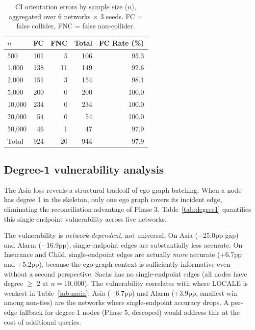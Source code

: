 \documentclass{article}
\begin{document}
\begin{table}[t]
\centering
\caption{CI orientation errors by sample size ($n$), aggregated over 6 networks $\times$ 3 seeds. FC = false collider, FNC = false non-collider.}
\label{tab:nco}
\small
\begin{tabular}{lrrrr}
\toprule
$n$ & FC & FNC & Total & FC Rate (\%) \\
\midrule
500    & 101 & 5  & 106 & 95.3 \\
1{,}000  & 138 & 11 & 149 & 92.6 \\
2{,}000  & 151 & 3  & 154 & 98.1 \\
5{,}000  & 200 & 0  & 200 & 100.0 \\
10{,}000 & 234 & 0  & 234 & 100.0 \\
20{,}000 & 54  & 0  & 54  & 100.0 \\
50{,}000 & 46  & 1  & 47  & 97.9 \\
\midrule
Total  & 924 & 20 & 944 & 97.9 \\
\bottomrule
\end{tabular}
\end{table}

\subsection{Degree-1 vulnerability analysis}
\label{sec:degree1}

The Asia loss reveals a structural tradeoff of ego-graph batching. When a node has degree 1 in the skeleton, only one ego graph covers its incident edge, eliminating the reconciliation advantage of Phase 3. Table~\ref{tab:degree1} quantifies this single-endpoint vulnerability across five networks.

The vulnerability is \textit{network-dependent}, not universal. On Asia ($-$25.0pp gap) and Alarm ($-$16.9pp), single-endpoint edges are substantially less accurate. On Insurance and Child, single-endpoint edges are actually \textit{more} accurate (+6.7pp and +5.2pp), because the ego-graph context is sufficiently informative even without a second perspective. Sachs has no single-endpoint edges (all nodes have degree $\geq$ 2 at $n{=}10{,}000$). The vulnerability correlates with where LOCALE is weakest in Table~\ref{tab:main}: Asia ($-6.7$pp) and Alarm (+3.9pp, smallest win among non-ties) are the networks where single-endpoint accuracy drops. A per-edge fallback for degree-1 nodes (Phase 5, descoped) would address this at the cost of additional queries.
\end{document}

